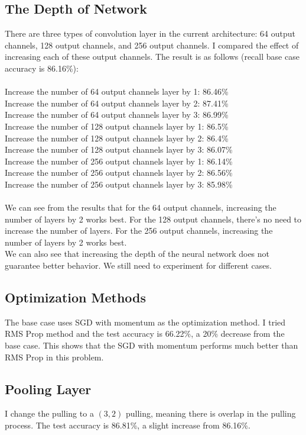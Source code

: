 \subsection{The Depth of Network}
There are three types of convolution layer in the current architecture: 64 output channels, 128 output channels, and 256 output channels. I compared the effect of increasing each of these output channels. The result is as follows (recall base case accuracy is 86.16\%): \\ \\
Increase the number of 64 output channels layer by 1:  86.46\% \\
Increase the number of 64 output channels layer by 2:  87.41\%\\
Increase the number of 64 output channels layer by 3:  86.99\%\\
Increase the number of 128 output channels layer by 1: 86.5\%\\
Increase the number of 128 output channels layer by 2: 86.4\%\\
Increase the number of 128 output channels layer by 3: 86.07\%\\
Increase the number of 256 output channels layer by 1: 86.14\%\\
Increase the number of 256 output channels layer by 2: 86.56\%\\
Increase the number of 256 output channels layer by 3: 85.98\%\\
\\
We can see from the results that for the 64 output channels, increasing the number of layers by 2 works best. For the 128 output channels, there's no need to increase the number of layers. For the 256 output channels, increasing the number of layers by 2 works best. \\
We can also see that increasing the depth of the neural network does not guarantee better behavior. We still need to experiment for different cases. 

\subsection{Optimization Methods}
The base case uses SGD with momentum as the optimization method. I tried RMS Prop method and the test accuracy is 66.22\%, a 20\% decrease from the base case. This shows that the SGD with momentum performs much better than RMS Prop in this problem. 

\subsection{Pooling Layer}
I change the pulling to a $(3,2)$ pulling, meaning there is overlap in the pulling process. The test accuracy is 86.81\%, a slight increase from 86.16\%.


